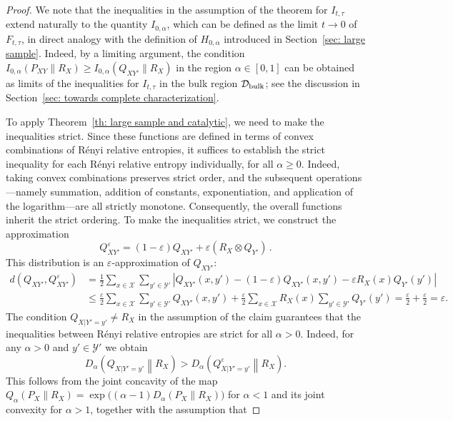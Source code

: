 \documentclass[aps,pra,11pt,onecolumn,nofootinbib,tightenlines]{revtex4-2}
\theoremstyle{definition}
\newcommand{\Y}{\mathcal{Y}}
\newcommand{\mc}[1]{\mathcal{#1}}
\begin{document}
\begin{proof}
We note that the inequalities in the assumption of the theorem for $I_{t,\tau}$ extend naturally to the quantity $I_{0,\alpha}$, which can be defined as the limit $t \to 0$ of $F_{t,\tau}$, in direct analogy with the definition of $H_{0,\alpha}$ introduced in Section~\ref{sec: large sample}. Indeed, by a limiting argument, the condition $I_{0,\alpha}(P_{XY}\|R_X) \geq I_{0,\alpha}(Q_{XY'}\|R_X)$ in the region $\alpha \in [0,1]$ can be obtained as limits of the inequalities for $I_{t,\tau}$ in the bulk region $\mathcal{D}_{\rm bulk}$; see the discussion in Section~\ref{sec: towards complete characterization}.

To apply Theorem~\ref{th: large sample and catalytic}, we need to make the inequalities strict. Since these functions are defined in terms of convex combinations of Rényi relative entropies, it suffices to establish the strict inequality for each Rényi relative entropy individually, for all \(\alpha \ge 0\). Indeed, taking convex combinations preserves strict order, and the subsequent operations—namely summation, addition of constants, exponentiation, and application of the logarithm—are all strictly monotone. Consequently, the overall functions inherit the strict ordering. To make the inequalities strict, we construct the approximation
\begin{equation}
    Q^\varepsilon_{XY'} = \left(1-\varepsilon\right) Q_{XY'} + \varepsilon (R_X \otimes Q_{Y'}) \,.
\end{equation}
This distribution is an $\varepsilon$-approximation of $Q_{XY'}$:
\begin{align}
d(Q_{XY'},Q^\varepsilon_{XY'})&=\frac{1}{2}\sum_{x\in\mc X}\sum_{y'\in\mc Y'}\left|Q_{XY'}(x,y')-(1-\varepsilon)Q_{XY'}(x,y')-\varepsilon R_X(x)Q_{Y'}(y')\right|\\
&\leq\frac{\varepsilon}{2}\sum_{x\in\mc X}\sum_{y'\in\mc Y'}Q_{XY'}(x,y')+\frac{\varepsilon}{2}\sum_{x\in\mc X}R_X(x)\sum_{y'\in\mc Y'}Q_{Y'}(y')=\frac{\varepsilon}{2}+\frac{\varepsilon}{2}=\varepsilon.
\end{align}
The condition $Q_{X|Y'=y'}\neq R_X$ in the assumption of the claim guarantees that the inequalities between R\'{e}nyi relative entropies are strict for all $\alpha>0$. Indeed, for any $\alpha>0$ and $ y'\in \Y'$ we obtain
\begin{equation}
    D_\alpha\!\left(Q_{X|Y'=y'} \middle\| R_X \right)
    >
    D_\alpha\!\left(Q^\varepsilon_{X|Y'=y'} \middle\| R_X \right) .
\end{equation}
This follows from the joint concavity of the map $Q_\alpha(P_X\|R_X) = \exp\!\bigl((\alpha-1)D_\alpha(P_X\|R_X)\bigr)$ for $\alpha<1$ and its joint convexity for $\alpha>1$, together with the assumption that

\end{proof}
\end{document}
